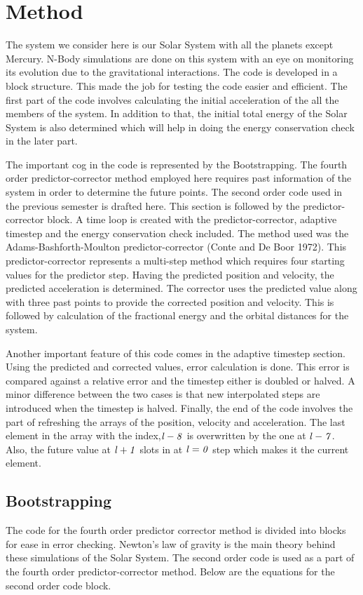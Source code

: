 \documentclass{article}
\begin{document}
\section{Method}
{\normalsize{
The system we consider here is our Solar System with all the planets except Mercury. N-Body simulations are done on this system with an eye on monitoring its evolution due to the gravitational interactions. The code is developed in a block structure. This made the job for testing the code easier and efficient. The first part of the code involves calculating the initial acceleration of the all the members of the system. In addition to that, the initial total energy of the Solar System is also determined which will help in doing the energy conservation check in the later part.
\medskip

The important cog in the code is represented by the Bootstrapping. The fourth order predictor-corrector method employed here requires past information of the system in order to determine the future points. The second order code used in the previous semester is drafted here. This section is followed by the predictor-corrector block. A time loop is created with the predictor-corrector, adaptive timestep and the energy conservation check included. The method used was the Adams-Bashforth-Moulton predictor-corrector (Conte and De Boor 1972). This predictor-corrector represents a multi-step method which requires four starting values for the predictor step. Having the predicted position and velocity, the predicted acceleration is determined. The corrector uses the predicted value along with three past points to provide the corrected position and velocity. This is followed by calculation of the fractional energy and the orbital distances for the system. 
\medskip

Another important feature of this code comes in the adaptive timestep section. Using the predicted and corrected values, error calculation is done. This error is compared against a relative error and the timestep either is doubled or halved. A minor difference between the two cases is that new interpolated steps are introduced when the timestep is halved. Finally, the end of the code involves the part of refreshing the arrays of the position, velocity and acceleration. The last element in the array with the index,${\it l-8}$ is overwritten by the one at ${\it l-7}$. Also, the future value at ${\it l+1}$ slots in at ${\it l=0}$ step which makes it the current element. 
\medskip
 
}}
\subsection{Bootstrapping}
{\normalsize{
The code for the fourth order predictor corrector method is divided into blocks for ease in error checking. Newton's law of gravity is the main theory behind these simulations of the Solar System. The second order code is used as a part of the fourth order predictor-corrector method. Below are the equations for the second order code block.}}
\end{document}
